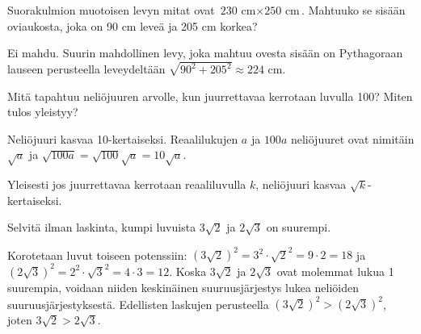 \begin{tehtavasivu}
\begin{tehtava}
        \begin{vastaus}
        \begin{alakohdatrivi}
        \end{alakohdatrivi}
        \end{vastaus}
\end{tehtava}

\begin{tehtava}
        Suorakulmion muotoisen levyn mitat ovat $\text{230 cm} \times \text{250 cm}$. Mahtuuko se sisään oviaukosta, joka on 90 cm leveä ja 205 cm korkea?
       
        \begin{vastaus}
        Ei mahdu. Suurin mahdollinen levy, joka mahtuu ovesta sisään on Pythagoraan lauseen perusteella leveydeltään $\sqrt{90^2+205^2}\approx 224$ cm.
        \end{vastaus}
\end{tehtava}

\begin{tehtava}
        Mitä tapahtuu neliöjuuren arvolle, kun juurrettavaa kerrotaan luvulla 100? Miten tulos yleistyy?
       
        \begin{vastaus}
        Neliöjuuri kasvaa 10-kertaiseksi. Reaalilukujen $a$ ja $100a$ neliöjuuret ovat nimitäin $\sqrt{a}$ ja $\sqrt{100a}=\sqrt{100}\sqrt{a}=10\sqrt{a}$.
        
        Yleisesti jos juurrettavaa kerrotaan reaaliluvulla $k$, neliöjuuri kasvaa $\sqrt{k}$-kertaiseksi.
        \end{vastaus}
\end{tehtava}

\begin{tehtava}
        Selvitä ilman laskinta, kumpi luvuista $3\sqrt{2}$ ja $2\sqrt{3}$ on suurempi. 
       
        \begin{vastaus}
        Korotetaan luvut toiseen potenssiin: $(3\sqrt{2})^2=3^2\cdot\sqrt{2}^2=9 \cdot 2=18$ ja $(2\sqrt{3})^2=2^2\cdot\sqrt{3}^2=4 \cdot 3=12$. Koska $3\sqrt{2}$ ja $2\sqrt{3}$ ovat molemmat lukua 1 suurempia, voidaan niiden keskinäinen suuruusjärjestys lukea neliöiden suuruusjärjestyksestä. Edellisten laskujen perusteella $(3\sqrt{2})^2 > (2\sqrt{3})^2$, joten $3\sqrt{2} > 2\sqrt{3}$.
        \end{vastaus}
\end{tehtava}

\end{tehtavasivu}
